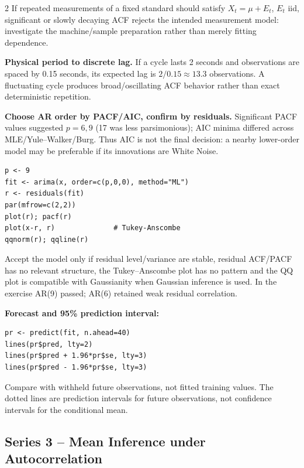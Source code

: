 \documentclass[9pt,a4paper]{extarticle}
\newcommand{\key}[1]{\textbf{#1}}
\begin{document}
\begin{multicols}{2}
If repeated measurements of a fixed standard should satisfy \(X_t=\mu+E_t\), \(E_t\) iid, significant or slowly decaying ACF rejects the intended measurement model: investigate the machine/sample preparation rather than merely fitting dependence.

\key{Physical period to discrete lag.} If a cycle lasts 2 seconds and observations are spaced by 0.15 seconds, its expected lag is \(2/0.15\approx13.3\) observations. A fluctuating cycle produces broad/oscillating ACF behavior rather than exact deterministic repetition.

\key{Choose AR order by PACF/AIC, confirm by residuals.} Significant PACF values suggested \(p=6,9\) (17 was less parsimonious); AIC minima differed across MLE/Yule--Walker/Burg. Thus AIC is not the final decision: a nearby lower-order model may be preferable if its innovations are White Noise.
{\scriptsize
\begin{verbatim}
p <- 9
fit <- arima(x, order=c(p,0,0), method="ML")
r <- residuals(fit)
par(mfrow=c(2,2))
plot(r); pacf(r)
plot(x-r, r)              # Tukey-Anscombe
qqnorm(r); qqline(r)
\end{verbatim}}
Accept the model only if residual level/variance are stable, residual ACF/PACF has no relevant structure, the Tukey--Anscombe plot has no pattern and the QQ plot is compatible with Gaussianity when Gaussian inference is used. In the exercise AR(9) passed; AR(6) retained weak residual correlation.

\key{Forecast and 95\% prediction interval:}
{\scriptsize
\begin{verbatim}
pr <- predict(fit, n.ahead=40)
lines(pr$pred, lty=2)
lines(pr$pred + 1.96*pr$se, lty=3)
lines(pr$pred - 1.96*pr$se, lty=3)
\end{verbatim}}
Compare with withheld future observations, not fitted training values. The dotted lines are prediction intervals for future observations, not confidence intervals for the conditional mean.

\subsection*{Series 3 -- Mean Inference under Autocorrelation}


\end{multicols}
\end{document}

